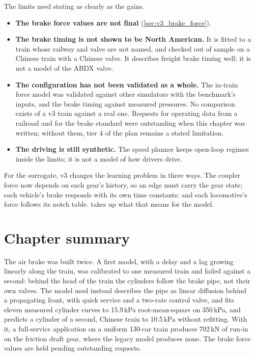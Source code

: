 The limits need stating as clearly as the gains.

\begin{itemize}
    \item \textbf{The brake force values are not final} (\cref{sec:v3_brake_force}).
    \item \textbf{The brake timing is not shown to be North American.} It is fitted to a train whose railway and valve are not named, and checked out of sample on a Chinese train with a Chinese valve. It describes freight brake timing well; it is not a model of the ABDX valve.
    \item \textbf{The configuration has not been validated as a whole.} The in-train force model was validated against other simulators with the benchmark's inputs, and the brake timing against measured pressures. No comparison exists of a v3 train against a real one. Requests for operating data from a railroad and for the brake standard were outstanding when this chapter was written; without them, tier 4 of the plan remains a stated limitation.
    \item \textbf{The driving is still synthetic.} The speed planner keeps open-loop regimes inside the limits; it is not a model of how drivers drive.
\end{itemize}

For the surrogate, v3 changes the learning problem in three ways. The coupler force now depends on each gear's history, so an edge must carry the gear state; each vehicle's brake responds with its own time constants; and each locomotive's force follows its notch table.  takes up what that means for the model.

\section{Chapter summary}

The air brake was built twice. A first model, with a delay and a lag growing linearly along the train, was calibrated to one measured train and failed against a second: behind the head of the train the cylinders follow the brake pipe, not their own valves. The model used instead describes the pipe as linear diffusion behind a propagating front, with quick service and a two-rate control valve, and fits eleven measured cylinder curves to 15.9\,kPa root-mean-square on 350\,kPa, and predicts a cylinder of a second, Chinese train to 10.5\,kPa without refitting. With it, a full-service application on a uniform 130-car train produces 702\,kN of run-in on the friction draft gear, where the legacy model produces none. The brake force values are held pending outstanding requests.

